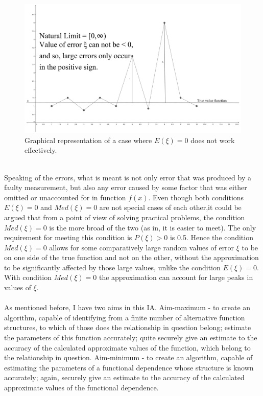 \documentclass[11pt]{article}
\numberwithin{equation}{subsection}
\begin{document}
\begin{figure}[h!]
\includegraphics[scale=0.07]{natural_limits}
\centering
\caption{Graphical representation of a case where $E(\xi)=0$ does not work effectively.}
\label{fig:graph-nl}
\end{figure}
\\
Speaking of the errors, what is meant is not only error that was produced by a faulty measurement, but also any error caused by some factor that was either omitted or unaccounted for in function $f(x)$. Even though both conditions $E(\xi)=0$ and $Med(\xi)=0$ are not special cases of each other,it could be argued that from a point of view of solving practical problems, the condition $Med(\xi)=0$ is the more broad of the two (as in, it is easier to meet). The only requirement for meeting this condition is $P(\xi)>0$ is 0.5.  Hence the condition $Med(\xi)=0$ allows for some comparatively large random values of error $\xi$ to be on one side of the true function and not on the other, without the approximation to be significantly affected by those large values, unlike the condition $E(\xi)=0$. With condition $Med(\xi)=0$ the approximation can account for large peaks in values of $\xi$.\\
\\
As mentioned before, I have two aims in this IA. Aim-maximum - to create an algorithm, capable of identifying from a finite number of alternative function structures, to which of those does the relationship in question belong; estimate the parameters of this function accurately; quite securely give an estimate to the accuracy of the calculated approximate values of the function, which belong to the relationship in question. Aim-minimum - to create an algorithm, capable of estimating the parameters of a functional dependence whose structure is known accurately; again, securely give an estimate to the accuracy of the calculated approximate values of the functional dependence. \\
\end{document}
